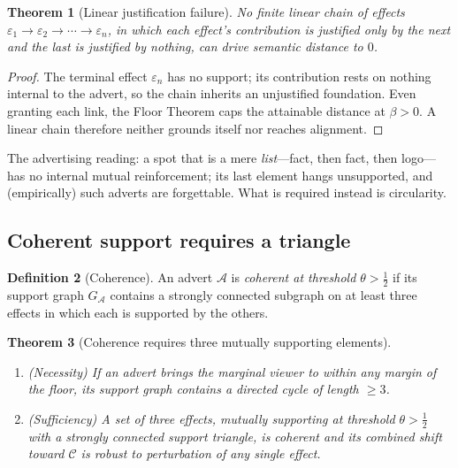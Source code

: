 \documentclass[twocolumn,11pt,a4paper]{article}
\theoremstyle{adv}
\newtheorem{theorem}{Theorem}[section]
\theoremstyle{definition}
\newtheorem{definition}[theorem]{Definition}
\theoremstyle{remark}
\newcommand{\Cell}{\mathcal{C}}        %
\newcommand{\floor}{\beta}            %
\newcommand{\Eff}{\varepsilon}        %
\newcommand{\Adv}{\mathcal{A}}        %
\newcommand{\half}{\tfrac{1}{2}}
\begin{document}
\begin{theorem}[Linear justification failure]
\label{thm:linear}
No finite linear chain of effects
$\Eff_1\to\Eff_2\to\cdots\to\Eff_n$, in which each effect's contribution is
justified only by the next and the last is justified by nothing, can drive
semantic distance to $0$.
\end{theorem}

\begin{proof}
The terminal effect $\Eff_n$ has no support; its contribution rests on
nothing internal to the advert, so the chain inherits an unjustified
foundation. Even granting each link, the Floor Theorem caps the attainable
distance at $\floor>0$. A linear chain therefore neither grounds itself nor
reaches alignment.
\end{proof}

The advertising reading: a spot that is a mere \emph{list}---fact, then
fact, then logo---has no internal mutual reinforcement; its last element
hangs unsupported, and (empirically) such adverts are forgettable. What is
required instead is circularity.

\subsection{Coherent support requires a triangle}

\begin{definition}[Coherence]
\label{def:coherence}
An advert $\Adv$ is \emph{coherent at threshold $\theta>\half$} if its
support graph $G_\Adv$ contains a strongly connected subgraph on at least
three effects in which each is supported by the others.
\end{definition}

\begin{theorem}[Coherence requires three mutually supporting elements]
\label{thm:triangle}
\leavevmode
\begin{enumerate}[label=(\roman*),leftmargin=1.8em,itemsep=2pt]
\item \emph{(Necessity)} If an advert brings the marginal viewer to within
  any margin of the floor, its support graph contains a directed cycle of
  length $\ge3$.
\item \emph{(Sufficiency)} A set of three effects, mutually supporting at
  threshold $\theta>\half$ with a strongly connected support triangle, is
  coherent and its combined shift toward $\Cell$ is robust to perturbation
  of any single effect.
\end{enumerate}
\end{theorem}
\end{document}
